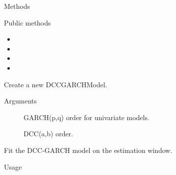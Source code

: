 \documentclass[a4paper]{book}
\begin{document}
\begin{Section}{Methods}
%
\begin{SubSection}{Public methods}
\begin{itemize}

\item{} 
\item{} 
\item{} 
\item{} 

\end{itemize}

\end{SubSection}



\hypertarget{method-DCCGARCHModel-initialize}{}
%
\begin{SubSection}{}
Create a new DCCGARCHModel.
%

%
\begin{SubSubSection}{Arguments}

\begin{description}

\item[] GARCH(p,q) order for univariate models.
\item[] DCC(a,b) order.

\end{description}



\end{SubSubSection}

\end{SubSection}




\hypertarget{method-DCCGARCHModel-fit}{}
%
\begin{SubSection}{}
Fit the DCC-GARCH model on the estimation window.
%
\begin{SubSubSection}{Usage}


\end{SubSubSection}
\end{SubSection}
\end{Section}
\end{document}
